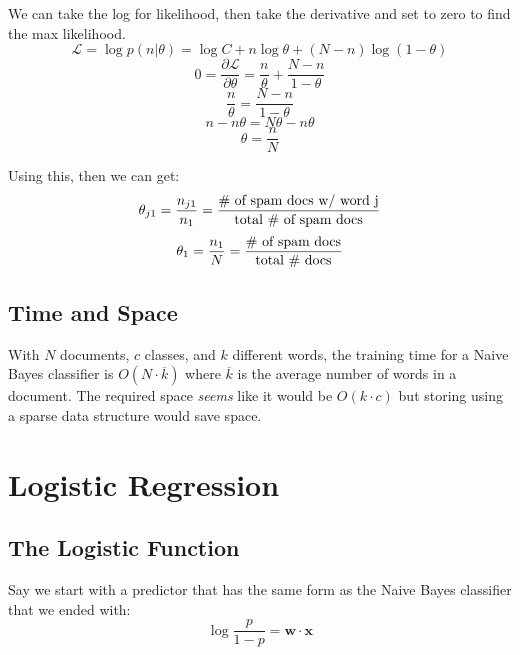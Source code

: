 We can take the log for likelihood, then take the derivative and set to zero to find the max likelihood.
\begin{equation}
\mathcal{L} = \log p(n|\theta) = \log C + n \log {\theta} + (N - n) \log (1 - \theta)
\end{equation}
\begin{equation}
0 = \frac{\partial \mathcal{L}}{\partial \theta} = \frac{n}{\theta} + \frac{N-n}{1-\theta}
\end{equation}
\begin{equation}
\frac{n}{\theta} = \frac{N-n}{1-\theta}
\end{equation}
\begin{equation}
n - n\theta = N\theta - n\theta
\end{equation}
\begin{equation}
\theta = \frac{n}{N}
\end{equation}

Using this, then we can get:
\begin{equation}
\theta_{j1} = \frac{n_{j1}}{n_1} = \frac{\textnormal{\# of spam docs w/ word j}}{\textnormal{total \# of spam docs}}
\end{equation}
\begin{equation}
\theta_{1} = \frac{n_{1}}{N} = \frac{\textnormal{\# of spam docs}}{\textnormal{total \# docs}}
\end{equation}

\subsection{Time and Space}
With $N$ documents, $c$ classes, and $k$ different words, the training time for a Naive Bayes classifier is $O(N\cdot \overline{k})$ where $\overline{k}$ is the average number of words in a document. The required space \textit{seems} like it would be $O(k \cdot c)$ but storing using a sparse data structure would save space.

\section{Logistic Regression}
\subsection{The Logistic Function}
Say we start with a predictor that has the same form as the Naive Bayes classifier that we ended with:
\begin{equation}
\log \frac{p}{1-p} = \textbf{w} \cdot \textbf{x}
\end{equation}

